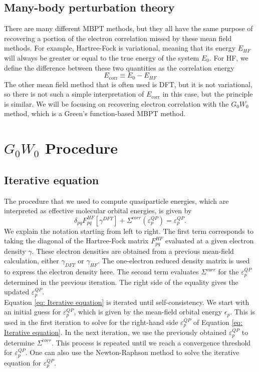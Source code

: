 \documentclass[12pt]{caltech_thesis}
\begin{document}
\section{Many-body perturbation theory}
There are many different MBPT methods, but they all have the same purpose of recovering a portion of the electron correlation missed by these mean field methods. For example, Hartree-Fock is variational, meaning that its energy $E_{HF}$ will always be greater or equal to the true energy of the system $E_0$. For HF, we define the difference between these two quantities as the correlation energy
\begin{equation}
    E_{\text{corr}} \equiv E_0 - E_{HF}
\end{equation}
The other mean field method that is often used is DFT, but it is not variational, so there is not such a simple interpretation of $E_{\text{corr}}$ in this case, but the principle is similar. We will be focusing on recovering electron correlation with the $G_0W_0$ method, which is a Green's function-based MBPT method.



\chapter{$G_0W_0$ Procedure}
\section{Iterative equation}
The procedure that we used to compute quasiparticle energies, which are interpreted as effective molecular orbital energies, is given by 
\begin{equation}
    \delta_{pq}F_{pq}^{HF}[\gamma^{DFT}] + \Sigma^{corr}(\varepsilon_{p}^{QP}) = \varepsilon_{p}^{QP}.
\label{eq: Iterative equation}
\end{equation}
We explain the notation starting from left to right. The first term corresponds to taking the diagonal of the Hartree-Fock matrix $F_{pq}^{HF}$ evaluated at a given electron density $\gamma$. These electron densities are obtained from a previous mean-field calculation, either $\gamma_{DFT}$ or $\gamma_{HF}$. The one-electron reduced density matrix is used to express the electron density here. The second term evaluates $\Sigma^{corr}$ for the $\varepsilon_{p}^{QP}$ determined in the previous iteration. The right side of the equality gives the updated $\varepsilon_{p}^{QP}$.\\ Equation \ref{eq: Iterative equation} is iterated until self-consistency. We start with an initial guess for $\varepsilon_{p}^{QP}$, which is given by the mean-field orbital energy $\epsilon_p$. This is used in the first iteration to solve for the right-hand side $\varepsilon_{p}^{QP}$ of Equation \ref{eq: Iterative equation}. In the next iteration, we use the previously obtained $\varepsilon_{p}^{QP}$ to determine $\Sigma^{corr}$. This process is repeated until we reach a convergence threshold for $\varepsilon_{p}^{QP}$. One can also use the Newton-Raphson method to solve the iterative equation for $\varepsilon_{p}^{QP}$.
\end{document}
